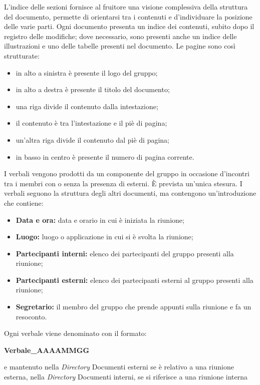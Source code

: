 L'indice delle sezioni fornisce al fruitore una visione complessiva della struttura del documento, permette di orientarsi tra i contenuti e d'individuare la posizione delle varie parti. Ogni documento presenta un indice dei contenuti, subito dopo il registro delle modifiche; dove necessario, sono presenti anche un indice delle illustrazioni e uno delle tabelle presenti nel documento.
Le pagine sono così strutturate:
\begin{itemize}
    \item in alto a sinistra è presente il logo del gruppo;
    \item in alto a destra è presente il titolo del documento;
    \item una riga divide il contenuto dalla intestazione;
    \item il contenuto è tra l'intestazione e il piè di pagina;
    \item un'altra riga divide il contenuto dal piè di pagina;
    \item in basso in centro è presente il numero di pagina corrente.
\end{itemize}
I verbali vengono prodotti da un componente del gruppo in occasione d'incontri tra i membri con o senza la presenza di esterni. È prevista un'unica stesura. I verbali seguono la struttura degli altri documenti, ma contengono un'introduzione che contiene:
\begin{itemize}
    \item \textbf{Data e ora:} data e orario in cui è iniziata la riunione;
    \item \textbf{Luogo:} luogo o applicazione in cui si è svolta la riunione;
    \item \textbf{Partecipanti interni:} elenco dei partecipanti del gruppo presenti alla riunione;
    \item \textbf{Partecipanti esterni:} elenco dei partecipanti esterni al gruppo presenti alla riunione;
    \item \textbf{Segretario:} il membro del gruppo che prende appunti sulla riunione e fa un resoconto.
\end{itemize}
Ogni verbale viene denominato con il formato:
\begin{center}
    \textbf{Verbale\_AAAAMMGG} \\
\end{center}
e mantenuto nella \textit{Directory} Documenti esterni se è relativo a una riunione esterna, nella \textit{Directory} Documenti interni, se si riferisce a una riunione interna
